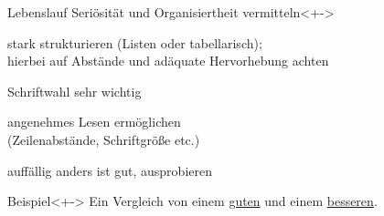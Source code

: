 \begin{frame}{Lebenslauf}
  \alert{Seriösität und Organisiertheit vermitteln}<+->
  \begin{description}[Organisiertheit]
  \item[Organisiertheit] stark strukturieren (Listen oder
    tabellarisch); \\
    hierbei auf Abstände und adäquate Hervorhebung achten
  \item[Seriösität] Schriftwahl sehr wichtig
  \item[Lesbarkeit] angenehmes Lesen ermöglichen \\
    (Zeilenabstände, Schriftgröße etc.)
  \item[Aufmerksamkeit] auffällig anders ist gut, ausprobieren
  \end{description}
  \begin{exampleblock}{Beispiel}<+->
    Ein Vergleich von einem \href{./examples/cv_besser.pdf}{guten}
    und einem \href{./examples/cv_besser.pdf}{besseren}.%
  \end{exampleblock}
\end{frame}

